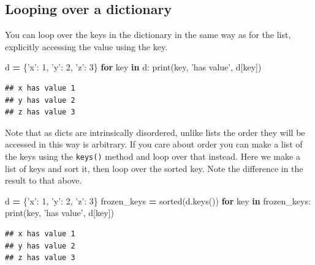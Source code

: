 \documentclass[]{book}
\newenvironment{Shaded}{\begin{snugshade}}{\end{snugshade}}
\newcommand{\BuiltInTok}[1]{#1}
\newcommand{\ControlFlowTok}[1]{\textcolor[rgb]{0.13,0.29,0.53}{\textbf{#1}}}
\newcommand{\DecValTok}[1]{\textcolor[rgb]{0.00,0.00,0.81}{#1}}
\newcommand{\KeywordTok}[1]{\textcolor[rgb]{0.13,0.29,0.53}{\textbf{#1}}}
\newcommand{\NormalTok}[1]{#1}
\newcommand{\OperatorTok}[1]{\textcolor[rgb]{0.81,0.36,0.00}{\textbf{#1}}}
\newcommand{\StringTok}[1]{\textcolor[rgb]{0.31,0.60,0.02}{#1}}
\theoremstyle{definition}
\theoremstyle{definition}
\theoremstyle{definition}
\theoremstyle{remark}
\begin{document}
\hypertarget{looping-over-a-dictionary}{%
\subsection{Looping over a dictionary}\label{looping-over-a-dictionary}}

You can loop over the keys in the dictionary in the same way as for the
list, explicitly accessing the value using the key.

\begin{Shaded}
\begin{Highlighting}[]
\NormalTok{d }\OperatorTok{=}\NormalTok{ \{}\StringTok{'x'}\NormalTok{: }\DecValTok{1}\NormalTok{, }\StringTok{'y'}\NormalTok{: }\DecValTok{2}\NormalTok{, }\StringTok{'z'}\NormalTok{: }\DecValTok{3}\NormalTok{\} }
\ControlFlowTok{for}\NormalTok{ key }\KeywordTok{in}\NormalTok{ d:}
    \BuiltInTok{print}\NormalTok{(key, }\StringTok{'has value'}\NormalTok{, d[key])}
\end{Highlighting}
\end{Shaded}

\begin{verbatim}
## x has value 1
## y has value 2
## z has value 3
\end{verbatim}

Note that as dicts are intrinsically disordered, unlike lists the order
they will be accessed in this way is arbitrary. If you care about order
you can make a list of the keys using the \texttt{keys()} method and
loop over that instead. Here we make a list of keys and sort it, then
loop over the sorted key. Note the difference in the result to that
above.

\begin{Shaded}
\begin{Highlighting}[]
\NormalTok{d }\OperatorTok{=}\NormalTok{ \{}\StringTok{'x'}\NormalTok{: }\DecValTok{1}\NormalTok{, }\StringTok{'y'}\NormalTok{: }\DecValTok{2}\NormalTok{, }\StringTok{'z'}\NormalTok{: }\DecValTok{3}\NormalTok{\} }
\NormalTok{frozen_keys }\OperatorTok{=} \BuiltInTok{sorted}\NormalTok{(d.keys())}
\ControlFlowTok{for}\NormalTok{ key }\KeywordTok{in}\NormalTok{ frozen_keys:}
    \BuiltInTok{print}\NormalTok{(key, }\StringTok{'has value'}\NormalTok{, d[key])}
\end{Highlighting}
\end{Shaded}

\begin{verbatim}
## x has value 1
## y has value 2
## z has value 3
\end{verbatim}
\end{document}
